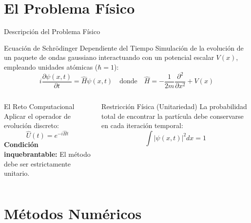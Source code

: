 \documentclass[aspectratio=169,10pt,xcolor=table]{beamer}
\begin{document}
\section{El Problema Físico}

\begin{frame}[shrink=5]{Descripción del Problema Físico}
  \begin{block}{Ecuación de Schrödinger Dependiente del Tiempo}
    Simulación de la evolución de un paquete de ondas gaussiano interactuando con un potencial escalar $V(x)$, empleando unidades atómicas ($\hbar=1$):
    \vspace{-0.2cm}
    \[
      i \frac{\partial \psi(x,t)}{\partial t} = \hat{H} \psi(x,t) \quad \text{donde} \quad \hat{H} = -\frac{1}{2m}\frac{\partial^2}{\partial x^2} + V(x)
    \]
  \end{block}

  \vspace{0.1cm}
  \begin{columns}[t]
      \begin{block}{El Reto Computacional}
        Aplicar el operador de evolución discreto:
        \[ \hat{U}(t) = e^{-i\hat{H}t} \]
        \textbf{Condición inquebrantable:} El método debe ser estrictamente unitario.
      \end{block}
      \begin{alertblock}{Restricción Física (Unitariedad)}
        La probabilidad total de encontrar la partícula debe conservarse en cada iteración temporal:
        \[ \int |\psi(x,t)|^2 dx = 1 \]
      \end{alertblock}
  \end{columns}
\end{frame}

\section{Métodos Numéricos}
\end{document}
